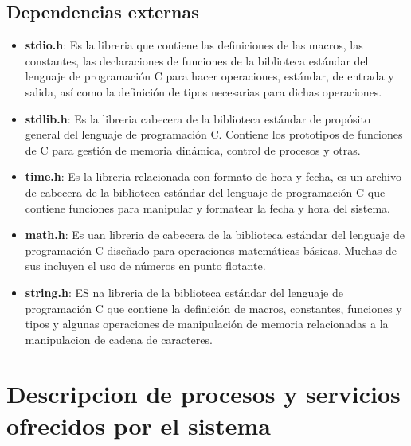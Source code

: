 \documentclass[12pt,twocolum,a4paper]{article}
\begin{document}
\subsection{Dependencias externas}
\begin{itemize}
    \item {\bf stdio.h}: Es la libreria que contiene las definiciones de las macros, las constantes, las declaraciones de funciones de la biblioteca estándar del lenguaje de programación C para hacer operaciones, estándar, de entrada y salida, así como la definición de tipos necesarias para dichas operaciones.
    \item {\bf stdlib.h}: Es la libreria cabecera de la biblioteca estándar de propósito general del lenguaje de programación C. Contiene los prototipos de funciones de C para gestión de memoria dinámica, control de procesos y otras.
    \item {\bf time.h}: Es la libreria relacionada con formato de hora y fecha, es un archivo de cabecera de la biblioteca estándar del lenguaje de programación C que contiene funciones para manipular y formatear la fecha y hora del sistema.
    \item {\bf math.h}: Es uan libreria de cabecera de la biblioteca estándar del lenguaje de programación C diseñado para operaciones matemáticas básicas. Muchas de sus incluyen el uso de números en punto flotante.
    \item {\bf string.h}: ES na libreria de la biblioteca estándar del lenguaje de programación C que contiene la definición de macros, constantes, funciones y tipos y algunas operaciones de manipulación de memoria relacionadas a la manipulacion de cadena de caracteres.
\end{itemize}

\section{Descripcion de procesos y servicios ofrecidos por el sistema}
\end{document}
